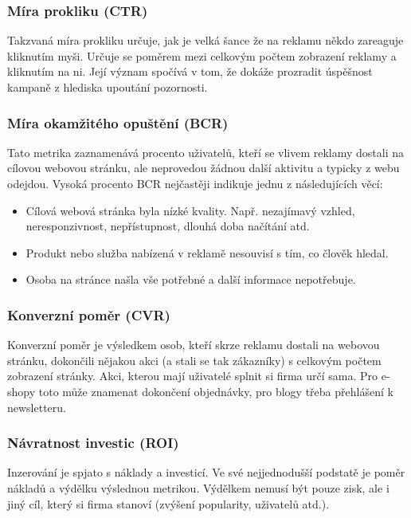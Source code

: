         \subsubsection{Míra prokliku (CTR)}
        Takzvaná míra prokliku určuje, jak je velká šance že na reklamu někdo zareaguje kliknutím myši. Určuje se poměrem mezi celkovým počtem zobrazení reklamy a
        kliknutím na ni. Její význam spočívá v tom, že dokáže prozradit úspěšnost kampaně z hlediska upoutání pozornosti.

        \subsubsection{Míra okamžitého opuštění (BCR)}
        Tato metrika zaznamenává procento uživatelů, kteří se vlivem reklamy dostali na cílovou webovou stránku, ale neprovedou žádnou další aktivitu a
        typicky z webu odejdou. Vysoká procento BCR nejčastěji indikuje jednu z následujících věcí:
        \begin{itemize}
            \item Cílová webová stránka byla nízké kvality. Např. nezajímavý vzhled, neresponzivnost, nepřístupnost, dlouhá doba načítání atd.
            \item Produkt nebo služba nabízená v reklamě nesouvisí s tím, co člověk hledal.
            \item Osoba na stránce našla vše potřebné a další informace nepotřebuje.
        \end{itemize}

        \subsubsection{Konverzní poměr (CVR)}
        Konverzní poměr je výsledkem osob, kteří skrze reklamu dostali na webovou stránku, dokončili nějakou akci (a stali se tak zákazníky) s
        celkovým počtem zobrazení stránky. Akci, kterou mají uživatelé splnit si firma určí sama. Pro e-shopy toto může znamenat dokončení objednávky,
        pro blogy třeba přehlášení k newsletteru.

        \subsubsection{Návratnost investic (ROI)}
        Inzerování je spjato s náklady a investicí. Ve své nejjednodušší podstatě je poměr nákladů a výdělku výslednou metrikou.
        Výdělkem nemusí být pouze zisk, ale i jiný cíl, který si firma stanoví (zvýšení popularity, uživatelů atd.).


